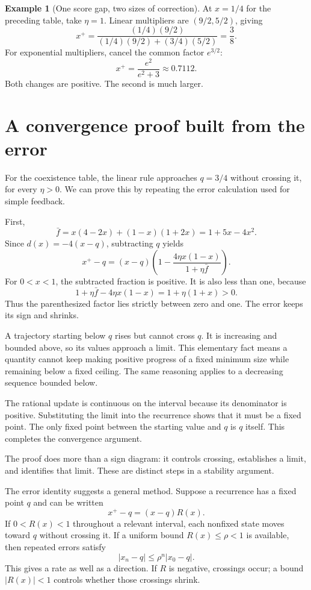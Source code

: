 \documentclass[11pt,oneside,openany]{book}
\theoremstyle{definition}
\newtheorem{example}{Example}[chapter]
\theoremstyle{remark}
\numberwithin{equation}{chapter}
\begin{document}
\begin{example}[One score gap, two sizes of correction]

At \(x=1/4\) for the preceding table, take \(\eta=1\). Linear multipliers are \((9/2,5/2)\), giving \[x^+=\frac{(1/4)(9/2)}{(1/4)(9/2)+(3/4)(5/2)}=\frac38.\] For exponential multipliers, cancel the common factor \(e^{3/2}\): \[x^+=\frac{e^2}{e^2+3}\approx0.7112.\] Both changes are positive. The second is much larger.

\end{example}

\section{A convergence proof built from the error}\label{ch02-a-convergence-proof-built-from-the-error}

For the coexistence table, the linear rule approaches \(q=3/4\) without crossing it, for every \(\eta>0\). We can prove this by repeating the error calculation used for simple feedback.

First, \[\bar f=x(4-2x)+(1-x)(1+2x)=1+5x-4x^2.\] Since \(d(x)=-4(x-q)\), subtracting \(q\) yields \[x^+-q=(x-q)\left(1-\frac{4\eta x(1-x)}{1+\eta\bar f}\right).\] For \(0<x<1\), the subtracted fraction is positive. It is also less than one, because \[1+\eta\bar f-4\eta x(1-x)=1+\eta(1+x)>0.\] Thus the parenthesized factor lies strictly between zero and one. The error keeps its sign and shrinks.

A trajectory starting below \(q\) rises but cannot cross \(q\). It is increasing and bounded above, so its values approach a limit. This elementary fact means a quantity cannot keep making positive progress of a fixed minimum size while remaining below a fixed ceiling. The same reasoning applies to a decreasing sequence bounded below.

The rational update is continuous on the interval because its denominator is positive. Substituting the limit into the recurrence shows that it must be a fixed point. The only fixed point between the starting value and \(q\) is \(q\) itself. This completes the convergence argument.

The proof does more than a sign diagram: it controls crossing, establishes a limit, and identifies that limit. These are distinct steps in a stability argument.

The error identity suggests a general method. Suppose a recurrence has a fixed point \(q\) and can be written \[x^+-q=(x-q)R(x).\] If \(0<R(x)<1\) throughout a relevant interval, each nonfixed state moves toward \(q\) without crossing it. If a uniform bound \(R(x)\leq\rho<1\) is available, then repeated errors satisfy \[|x_n-q|\leq\rho^n|x_0-q|.\] This gives a rate as well as a direction. If \(R\) is negative, crossings occur; a bound \(|R(x)|<1\) controls whether those crossings shrink.
\end{document}
